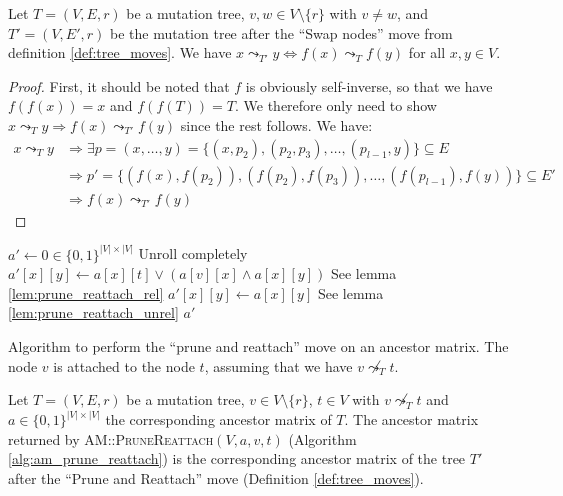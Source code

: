 \begin{lemma}
    \label{lem:swap_nodes_property}
    Let $T = (V, E, r)$ be a mutation tree, $v, w \in V \setminus \{r\}$ with $v \neq w$, and $T' = (V, E', r)$ be the mutation tree after the ``Swap nodes'' move from definition \ref{def:tree_moves}. We have $x \leadsto_{T'} y \Leftrightarrow f(x) \leadsto_T f(y)$ for all $x, y \in V$.
\end{lemma}

\begin{proof}
    First, it should be noted that $f$ is obviously self-inverse, so that we have $f(f(x)) = x$ and $f(f(T)) = T$. We therefore only need to show $x \leadsto_{T} y \Rightarrow f(x) \leadsto_{T'} f(y)$ since the rest follows. We have:
    \begin{align*}
        x \leadsto_T y &\Rightarrow \exists p = (x, \dots, y) = \{(x, p_2), (p_2, p_3), \dots, (p_{l-1}, y)\} \subseteq E \\
        &\Rightarrow p' = \{(f(x), f(p_2)), (f(p_2), f(p_3)), \dots, (f(p_{l-1}), f(y))\} \subseteq E' \\
        &\Rightarrow f(x) \leadsto_{T'} f(y)
    \end{align*}
\end{proof}

\begin{algorithm}[p]
    \begin{algorithmic}[1]
            \State $a' \leftarrow 0 \in \{0,1\}^{|V| \times |V|}$
                 \Comment Unroll completely
                        \State $a'[x][y] \leftarrow a[x][t] \vee (a[v][x] \wedge a[x][y])$ \Comment See lemma \ref{lem:prune_reattach_rel}
                    \Else
                        \State $a'[x][y] \leftarrow a[x][y]$ \Comment See lemma \ref{lem:prune_reattach_unrel}
                    \EndIf
                \EndFor
            \EndFor
            \State \Return $a'$
        \EndFunction
    \end{algorithmic}
    \caption{Algorithm to perform the ``prune and reattach'' move on an ancestor matrix. The node $v$ is attached to the node $t$, assuming that we have $v \not\leadsto_T t$.}
    \label{alg:am_prune_reattach}
\end{algorithm}

\begin{theorem}
    \label{theo:prune_reattach_correctness}
    Let $T = (V, E, r)$ be a mutation tree, $v \in V \setminus \{r\}$, $t \in V$ with $v \not\leadsto_T t$ and $a \in \{0,1\}^{|V| \times |V|}$ the corresponding ancestor matrix of $T$. The ancestor matrix returned by \textsc{AM::PruneReattach}$(V, a, v, t)$ (Algorithm \ref{alg:am_prune_reattach}) is the corresponding ancestor matrix of the tree $T'$ after the ``Prune and Reattach'' move (Definition \ref{def:tree_moves}).
\end{theorem}

